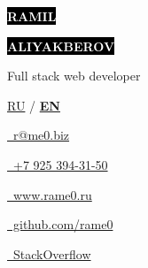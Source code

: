 \documentclass[10pt]{tpl/developercv} %
\begin{document}

\begin{minipage}[t]{0.44\textwidth} %
	\vspace{-\baselineskip} %

	\colorbox{black}{{\Huge\textcolor{white}{\textbf{\MakeUppercase{Ramil}}}}} %

	\colorbox{black}{{\Huge\textcolor{white}{\textbf{\MakeUppercase{Aliyakberov}}}}} %

	\vspace{6pt}

	{\Large Full stack web developer} %

  \vspace{6pt}

  \href{https://rame0.github.io/resume-latex/resume_ru.pdf}{RU} / \textbf{\underline{EN}}

\end{minipage}
\begin{minipage}[t]{0.275\textwidth} %
	\vspace{-\baselineskip} %


	\href{mailto:r@me0.biz}{\ r@me0.biz}

	\href{tel:+79253943150}{\ +7 925 394-31-50}
\end{minipage}
\begin{minipage}[t]{0.275\textwidth} %
	\vspace{-\baselineskip} %

	\href{https://www.rame0.ru/}{\ www.rame0.ru}

	\href{https://github.com/rame0}{\ github.com/rame0}

	\href{https://stackoverflow.com/users/513723/rame0}{\ StackOverflow}
\end{minipage}
\end{document}
